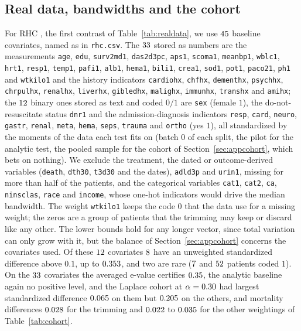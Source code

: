 \subsection{Real data, bandwidths and the cohort}
\label{sec:rdbw}

For RHC \citep{connors1996rhc}, the first contrast of Table~\ref{tab:realdata}, we use $45$ baseline
covariates, named as in \texttt{rhc.csv}. The $33$ stored as numbers are the measurements \texttt{age},
\texttt{edu}, \texttt{surv2md1}, \texttt{das2d3pc}, \texttt{aps1}, \texttt{scoma1}, \texttt{meanbp1}, \texttt{wblc1},
\texttt{hrt1}, \texttt{resp1}, \texttt{temp1}, \texttt{pafi1}, \texttt{alb1}, \texttt{hema1}, \texttt{bili1},
\texttt{crea1}, \texttt{sod1}, \texttt{pot1}, \texttt{paco21}, \texttt{ph1} and \texttt{wtkilo1} and the history
indicators \texttt{cardiohx}, \texttt{chfhx}, \texttt{dementhx}, \texttt{psychhx}, \texttt{chrpulhx}, \texttt{renalhx},
\texttt{liverhx}, \texttt{gibledhx}, \texttt{malighx}, \texttt{immunhx}, \texttt{transhx} and \texttt{amihx}; the
$12$ binary ones stored as text and coded $0/1$ are \texttt{sex} (female $1$), the do-not-resuscitate
status \texttt{dnr1} and the admission-diagnosis indicators \texttt{resp}, \texttt{card}, \texttt{neuro},
\texttt{gastr}, \texttt{renal}, \texttt{meta}, \texttt{hema}, \texttt{seps}, \texttt{trauma} and \texttt{ortho}
(yes $1$),
all standardized by the moments of the data each test fits on (batch $0$ of each split, the pilot for the analytic
test, the pooled sample for the cohort of Section~\ref{sec:appcohort}, which bets on nothing). We exclude the treatment, the dated or
outcome-derived variables (\texttt{death}, \texttt{dth30}, \texttt{t3d30} and the dates), \texttt{adld3p} and
\texttt{urin1}, missing for more than half of the patients, and the categorical variables \texttt{cat1}, \texttt{cat2},
\texttt{ca}, \texttt{ninsclas}, \texttt{race} and \texttt{income}, whose one-hot indicators would drive the median
bandwidth. The weight \texttt{wtkilo1} keeps the code $0$ that the data use for a missing weight; the zeros are a group of patients that the trimming may keep or discard like any other. The lower bounds hold for any longer vector, since total variation can only grow
with it, but the balance of Section~\ref{sec:appcohort} concerns the covariates used. Of these $12$ covariates $8$ have an unweighted standardized difference above $0.1$, up to
$0.353$, and two are rare ($7$ and $52$ patients coded $1$). On the $33$ covariates
the averaged e-value certifies $0.35$, the analytic baseline again no positive level, and the Laplace cohort at
$\alpha=0.30$ had largest standardized difference $0.065$ on them but $0.205$
on the others, and mortality differences $0.028$ for the trimming and $0.022$ to $0.035$ for the
other weightings of Table~\ref{tab:cohort}.

